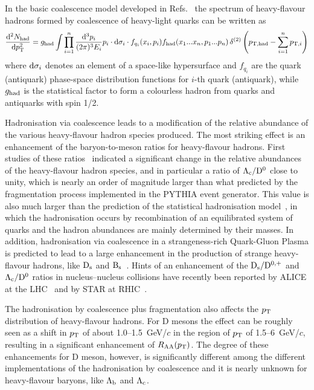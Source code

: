 In the basic coalescence model developed in Refs.~\cite{Greco:2003mm,Greco:2003vf,Fries:2003kq,Fries:2003vb,Oh:2009zj,Minissale:2015zwa,Plumari:2017ntm}
the spectrum of heavy-flavour hadrons formed by coalescence of heavy-light quarks can be written as
\begin{equation}
\label{eq-coal}
\frac{{\rm d}^{2}N_{\rm had}}{{\rm d}\pT^{2}}
= g_{\rm had} \int \prod^{n}_{i=1} \frac{{\rm d}^{3}p_{i}}{(2\pi)^{3}E_{i}} p_{i} 
\cdot {\rm d}\sigma_{i}  \cdot f_{q_i}(x_{i}, p_{i})  
f_{\rm had}(x_{1}...x_{n}, p_{1}...p_{n})\, 
\delta^{(2)} \left(p_{\rm T,had}-\sum^{n}_{i=1} p_{{\rm T},i}\right)
\end{equation}
where ${\rm d}\sigma_{i}$ denotes an element of a space-like hypersurface and $f_{q_i}$ are the quark (antiquark)
phase-space distribution functions for $i$-th quark (antiquark), while $g_{\rm had}$ is the statistical factor
to form a colourless hadron from quarks and antiquarks with spin 1/2.

Hadronisation via coalescence leads to a modification of the relative abundance of the
various heavy-flavour hadron species produced. 
The most striking effect is an enhancement of the baryon-to-meson ratios for heavy-flavour hadrons.
First studies of these ratios~\cite{Oh:2009zj,Plumari:2017ntm} indicated a significant change in the relative abundances of the heavy-flavour hadron species, and in particular a ratio of $\rm \Lambda_c/D^0$ close to unity, which
is nearly an order of magnitude larger than what predicted by the fragmentation
process implemented in the PYTHIA event generator. 
This value is also much larger than the
prediction of the statistical hadronisation model~\cite{Andronic:2007zu}, in which the hadronisation occurs by recombination of an equilibrated system of quarks and the hadron abundances are mainly determined by their masses.
In addition, hadronisation via coalescence in a strangeness-rich Quark-Gluon Plasma is predicted to lead to a large enhancement in the production of strange heavy-flavour hadrons, like $\rm D_s$ and $\rm B_s$~\cite{Kuznetsova:2006hx,He:2014cla,Song:2015ykw}.
Hints of an enhancement of the $\rm D_s/D^{0,+}$ and $\rm \Lambda_c/D^0$ ratios in nucleus--nucleus collisions have recently been reported by ALICE at the LHC~\cite{Acharya:2018hre,Peng:2018pwj} and by STAR at RHIC~\cite{Radhakrishnan:2018xxx}.

The hadronisation by coalescence plus fragmentation also affects the $p\sb{\scriptstyle\mathrm{T}}$ distribution  of heavy-flavour hadrons. For D mesons the effect can be roughly seen as a
shift in $p\sb{\scriptstyle\mathrm{T}}$ of about 1.0--1.5~GeV/$c$ in the region of $p\sb{\scriptstyle\mathrm{T}}$ of 1.5--6~GeV/$c$, resulting in a
significant enhancement of $R_{\rm AA}(p\sb{\scriptstyle\mathrm{T}})$. The degree of these enhancements for D meson, however, is
significantly different  among the different implementations of the hadronisation
by coalescence and it is nearly unknown for heavy-flavour baryons, like $\rm \Lambda_b$ and $\rm \Lambda_c$.

